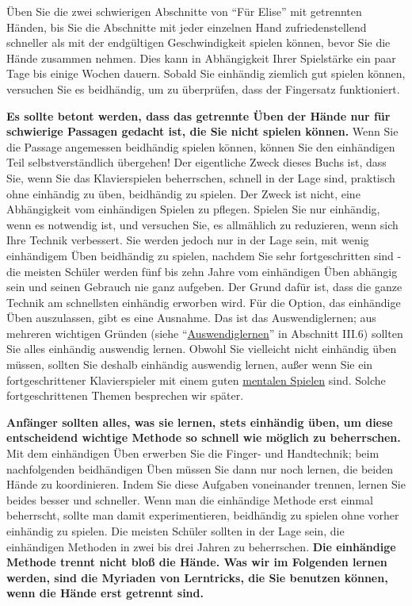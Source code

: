 Üben Sie die zwei schwierigen Abschnitte von \enquote{Für Elise} mit getrennten Händen, bis Sie die Abschnitte mit jeder einzelnen Hand zufriedenstellend schneller als mit der endgültigen Geschwindigkeit spielen können, bevor Sie die Hände zusammen nehmen.
Dies kann in Abhängigkeit Ihrer Spielstärke ein paar Tage bis einige Wochen dauern.
Sobald Sie einhändig ziemlich gut spielen können, versuchen Sie es beidhändig, um zu überprüfen, dass der Fingersatz funktioniert.

\textbf{Es sollte betont werden, dass das getrennte Üben der Hände nur für schwierige Passagen gedacht ist, die Sie nicht spielen können.}
Wenn Sie die Passage angemessen beidhändig spielen können, können Sie den einhändigen Teil selbstverständlich übergehen!
Der eigentliche Zweck dieses Buchs ist, dass Sie, wenn Sie das Klavierspielen beherrschen, schnell in der Lage sind, praktisch ohne einhändig zu üben, beidhändig zu spielen.
Der Zweck ist nicht, eine Abhängigkeit vom einhändigen Spielen zu pflegen.
Spielen Sie nur einhändig, wenn es notwendig ist, und versuchen Sie, es allmählich zu reduzieren, wenn sich Ihre Technik verbessert.
Sie werden jedoch nur in der Lage sein, mit wenig einhändigem Üben beidhändig zu spielen, nachdem Sie sehr fortgeschritten sind - die meisten Schüler werden fünf bis zehn Jahre vom einhändigen Üben abhängig sein und seinen Gebrauch nie ganz aufgeben.
Der Grund dafür ist, dass die ganze Technik am schnellsten einhändig erworben wird.
Für die Option, das einhändige Üben auszulassen, gibt es eine Ausnahme.
Das ist das Auswendiglernen; aus mehreren wichtigen Gründen (siehe \enquote{\hyperlink{c1iii6}{Auswendiglernen}} in Abschnitt III.6) sollten Sie alles einhändig auswendig lernen.
Obwohl Sie vielleicht nicht einhändig üben müssen, sollten Sie deshalb einhändig auswendig lernen, außer wenn Sie ein fortgeschrittener Klavierspieler mit einem guten \hyperlink{c1ii12mental}{mentalen Spielen} sind.
Solche fortgeschrittenen Themen besprechen wir später.

\textbf{Anfänger sollten alles, was sie lernen, stets einhändig üben, um diese entscheidend wichtige Methode so schnell wie möglich zu beherrschen.}
Mit dem einhändigen Üben erwerben Sie die Finger- und Handtechnik; beim nachfolgenden beidhändigen Üben müssen Sie dann nur noch lernen, die beiden Hände zu koordinieren.
Indem Sie diese Aufgaben voneinander trennen, lernen Sie beides besser und schneller.
Wenn man die einhändige Methode erst einmal beherrscht, sollte man damit experimentieren, beidhändig zu spielen ohne vorher einhändig zu spielen.
Die meisten Schüler sollten in der Lage sein, die einhändigen Methoden in zwei bis drei Jahren zu beherrschen.
\textbf{Die einhändige Methode trennt nicht bloß die Hände.
Was wir im Folgenden lernen werden, sind die Myriaden von Lerntricks, die Sie benutzen können, wenn die Hände erst getrennt sind.}

